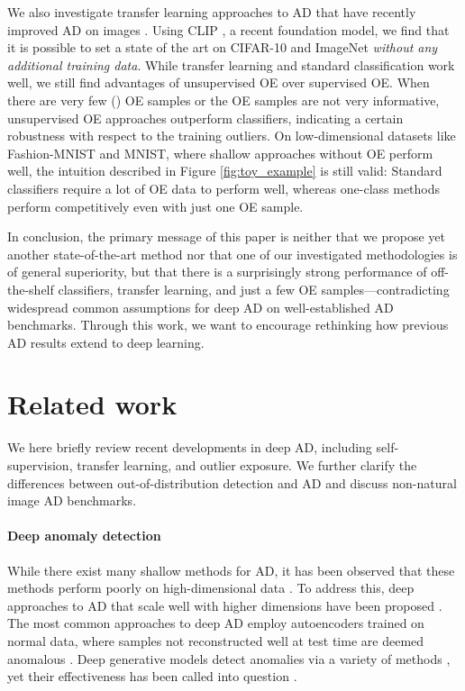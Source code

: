 \documentclass[10pt]{article} \usepackage[accepted]{stylefiles/tmlr}
\begin{document}
We also investigate transfer learning approaches to AD that have recently improved AD on images \citep{reiss2021panda, deecke2021transfer}. 
Using CLIP \citep{radford2021learning}, a recent foundation model, we find that it is possible to set a state of the art on CIFAR-10 and ImageNet \emph{without any additional training data}. 
While transfer learning and standard classification work well, we still find advantages of unsupervised OE over supervised OE.
When there are very few () OE samples or the OE samples are not very informative, unsupervised OE approaches outperform classifiers, indicating a certain robustness with respect to the training outliers.
On low-dimensional datasets like Fashion-MNIST and MNIST, where shallow approaches without OE perform well, the intuition described in Figure \ref{fig:toy_example} is still valid: 
Standard classifiers require a lot of OE data to perform well, whereas one-class methods perform competitively even with just one OE sample. 


In conclusion, the primary message of this paper is neither that we propose yet another state-of-the-art method nor that one of our investigated methodologies is of general superiority, but that there is a surprisingly strong performance of off-the-shelf classifiers, transfer learning, and just a few OE samples---contradicting widespread common assumptions for deep AD on well-established AD benchmarks. 
Through this work, we want to encourage rethinking how previous AD results extend to deep learning.









\section{Related work}
\label{sec:methods_background}
We here briefly review recent developments in deep AD, including self-supervision, transfer learning, and outlier exposure. We further clarify the differences between out-of-distribution detection and AD and discuss non-natural image AD benchmarks.

\paragraph{Deep anomaly detection}
While there exist many shallow methods for AD, it has been observed that these methods perform poorly on high-dimensional data \citep{huang2006large,kriegel2008angle,erfani2015r1svm,erfani2016high}. 
To address this, deep approaches to AD that scale well with higher dimensions have been proposed \citep{ruff2021,pang2021}.
The most common approaches to deep AD employ autoencoders trained on normal data, where samples not reconstructed well at test time are deemed anomalous \citep{hawkins2002outlier,sakurada2014anomaly,chen2017outlier,zhou2017,nguyen2019,kim20}. 
Deep generative models detect anomalies via a variety of methods \citep{schlegl2017unsupervised,deecke2018image,zenati2018efficient,schlegl2019}, yet their effectiveness has been called into question \citep{nalisnick2019}.
\end{document}
